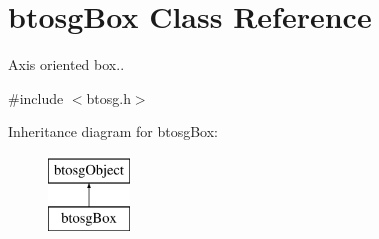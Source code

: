 \hypertarget{classbtosgBox}{}\section{btosg\+Box Class Reference}
\label{classbtosgBox}


Axis oriented box..  




{\ttfamily \#include $<$btosg.\+h$>$}

Inheritance diagram for btosg\+Box\+:\begin{figure}[H]
\begin{center}
\leavevmode
\includegraphics[height=2.000000cm]{classbtosgBox}
\end{center}
\end{figure}
